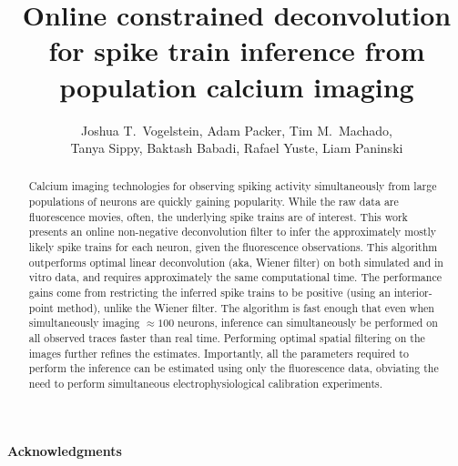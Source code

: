  
\usepackage{multicol}
\usepackage{hyperref}
\newcommand{\zzz}{z}
\newcommand{\az}{\argmax_{\bM \bC \geq \ve{0}}}
\newcommand{\anx}{\argmax_{n_t \in \mathbb{N}_0 \forall t}}
\newcommand{\foopsi}{fast }


\title{Online constrained deconvolution for spike train inference from population calcium imaging}

\author{Joshua T.~Vogelstein, Adam Packer, Tim M.~Machado, \\ Tanya Sippy, Baktash Babadi, Rafael Yuste, Liam Paninski}



\maketitle
\begin{abstract}
Calcium imaging technologies for observing spiking activity simultaneously from large populations of neurons are quickly gaining popularity.  While the raw data are fluorescence movies, often, the underlying spike trains are of interest.  This work presents an online non-negative deconvolution filter to infer the approximately mostly likely spike trains for each neuron, given the fluorescence observations.  This algorithm outperforms optimal linear deconvolution (aka, Wiener filter) on both simulated and in vitro data, and requires approximately the same computational time.  The performance gains come from restricting the inferred spike trains to be positive (using an interior-point method), unlike the Wiener filter.  The algorithm is fast enough that even when simultaneously imaging $\approx 100$ neurons, inference can simultaneously be performed on all observed traces faster than real time.  Performing optimal spatial filtering on the images further refines the estimates.  Importantly, all the parameters required to perform the inference can be estimated using only the fluorescence data, obviating the need to perform simultaneous electrophysiological calibration experiments.
\end{abstract}



\paragraph{Acknowledgments}

